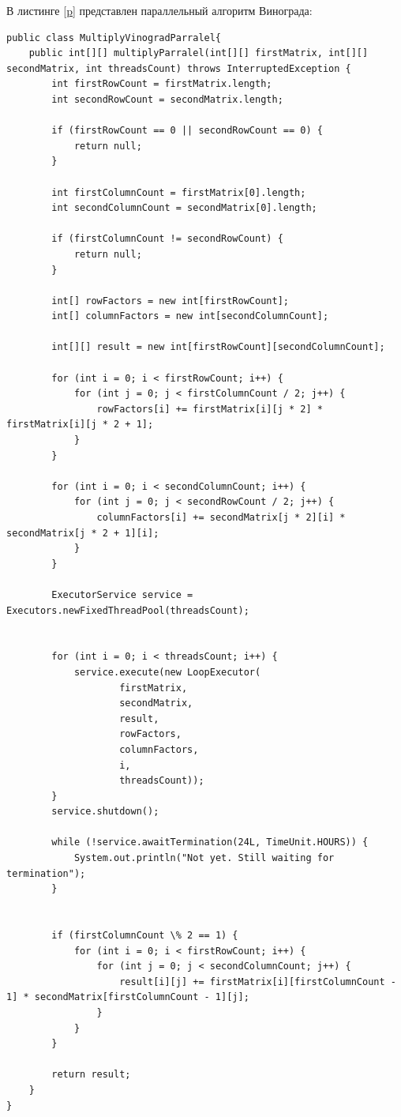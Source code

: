 \documentclass[12pt]{report}
\begin{document}
В листинге \ref{p} представлен параллельный алгоритм Винограда:\\

	\begin{lstlisting}[label=p,caption=Параллельный алгоритм Винограда]
public class MultiplyVinogradParralel{
    public int[][] multiplyParralel(int[][] firstMatrix, int[][] secondMatrix, int threadsCount) throws InterruptedException {
        int firstRowCount = firstMatrix.length;
        int secondRowCount = secondMatrix.length;

        if (firstRowCount == 0 || secondRowCount == 0) {
            return null;
        }

        int firstColumnCount = firstMatrix[0].length;
        int secondColumnCount = secondMatrix[0].length;

        if (firstColumnCount != secondRowCount) {
            return null;
        }

        int[] rowFactors = new int[firstRowCount];
        int[] columnFactors = new int[secondColumnCount];

        int[][] result = new int[firstRowCount][secondColumnCount];

        for (int i = 0; i < firstRowCount; i++) {
            for (int j = 0; j < firstColumnCount / 2; j++) {
                rowFactors[i] += firstMatrix[i][j * 2] * firstMatrix[i][j * 2 + 1];
            }
        }

        for (int i = 0; i < secondColumnCount; i++) {
            for (int j = 0; j < secondRowCount / 2; j++) {
                columnFactors[i] += secondMatrix[j * 2][i] * secondMatrix[j * 2 + 1][i];
            }
        }

        ExecutorService service = Executors.newFixedThreadPool(threadsCount);


        for (int i = 0; i < threadsCount; i++) {
            service.execute(new LoopExecutor(
                    firstMatrix,
                    secondMatrix,
                    result,
                    rowFactors,
                    columnFactors,
                    i,
                    threadsCount));
        }
        service.shutdown();

        while (!service.awaitTermination(24L, TimeUnit.HOURS)) {
            System.out.println("Not yet. Still waiting for termination");
        }


        if (firstColumnCount \% 2 == 1) {
            for (int i = 0; i < firstRowCount; i++) {
                for (int j = 0; j < secondColumnCount; j++) {
                    result[i][j] += firstMatrix[i][firstColumnCount - 1] * secondMatrix[firstColumnCount - 1][j];
                }
            }
        }

        return result;
    }
}
\end{lstlisting}
\end{document}
